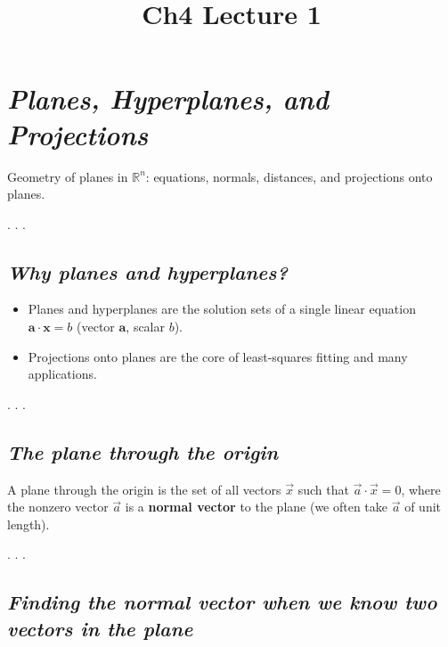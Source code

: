 \documentclass[
  letterpaper,
  DIV=11,
  numbers=noendperiod]{scrartcl}
\title{Ch4 Lecture 1}
\author{}
\date{}
\providecommand{\tightlist}{%
  \setlength{\itemsep}{0pt}\setlength{\parskip}{0pt}}\usepackage{longtable,booktabs,array}
\begin{document}
\maketitle


\section{\texorpdfstring{\emph{Planes, Hyperplanes, and
Projections}}{Planes, Hyperplanes, and Projections}}\label{planes-hyperplanes-and-projections}

Geometry of planes in \(\mathbb{R}^n\): equations, normals, distances,
and projections onto planes.

. . .

\subsection{\texorpdfstring{\emph{Why planes and
hyperplanes?}}{Why planes and hyperplanes?}}\label{why-planes-and-hyperplanes}

\begin{itemize}
\tightlist
\item
  Planes and hyperplanes are the solution sets of a single linear
  equation \(\mathbf{a} \cdot \mathbf{x} = b\) (vector \(\mathbf{a}\),
  scalar \(b\)).
\item
  Projections onto planes are the core of least-squares fitting and many
  applications.
\end{itemize}

. . .

\subsection{\texorpdfstring{\emph{The plane through the
origin}}{The plane through the origin}}\label{the-plane-through-the-origin}

A plane through the origin is the set of all vectors \(\vec x\) such
that \(\vec a \cdot \vec x = 0\), where the nonzero vector \(\vec a\) is
a \textbf{normal vector} to the plane (we often take \(\vec a\) of unit
length).

. . .

\subsection{\texorpdfstring{\emph{Finding the normal vector when we know
two vectors in the
plane}}{Finding the normal vector when we know two vectors in the plane}}\label{finding-the-normal-vector-when-we-know-two-vectors-in-the-plane}
\end{document}
